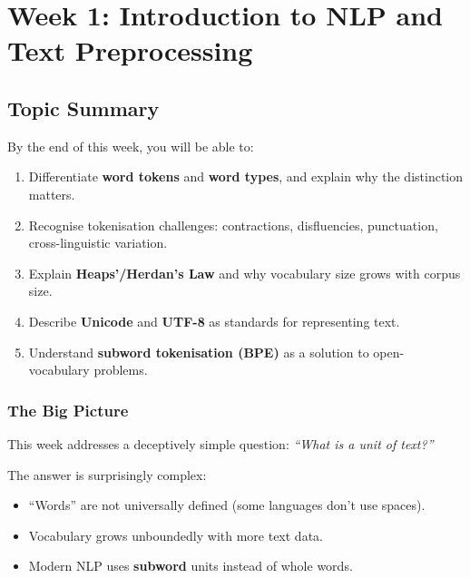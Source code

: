 \section{Week 1: Introduction to NLP and Text Preprocessing}

\subsection{Topic Summary}

\begin{keybox}
By the end of this week, you will be able to:
\begin{enumerate}
  \item Differentiate \textbf{word tokens} and \textbf{word types}, and explain why the distinction matters.
  \item Recognise tokenisation challenges: contractions, disfluencies, punctuation, cross-linguistic variation.
  \item Explain \textbf{Heaps'/Herdan's Law} and why vocabulary size grows with corpus size.
  \item Describe \textbf{Unicode} and \textbf{UTF-8} as standards for representing text.
  \item Understand \textbf{subword tokenisation (BPE)} as a solution to open-vocabulary problems.
\end{enumerate}
\end{keybox}

\separator

\subsubsection*{The Big Picture}

This week addresses a deceptively simple question: \textit{``What is a unit of text?''}

The answer is surprisingly complex:
\begin{itemize}
  \item ``Words'' are not universally defined (some languages don't use spaces).
  \item Vocabulary grows unboundedly with more text data.
  \item Modern NLP uses \textbf{subword} units instead of whole words.
\end{itemize}

